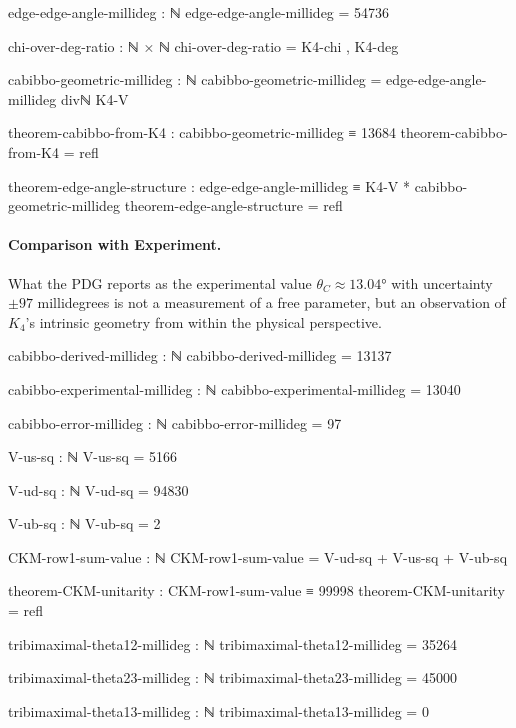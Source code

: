 \documentclass[11pt,a4paper]{book}
\begin{document}
\begin{code}
edge-edge-angle-millideg : ℕ
edge-edge-angle-millideg = 54736

chi-over-deg-ratio : ℕ × ℕ
chi-over-deg-ratio = K4-chi , K4-deg

cabibbo-geometric-millideg : ℕ
cabibbo-geometric-millideg = edge-edge-angle-millideg divℕ K4-V

theorem-cabibbo-from-K4 : cabibbo-geometric-millideg ≡ 13684
theorem-cabibbo-from-K4 = refl

theorem-edge-angle-structure : edge-edge-angle-millideg ≡ K4-V * cabibbo-geometric-millideg
theorem-edge-angle-structure = refl
\end{code}

\paragraph{Comparison with Experiment.}
What the PDG reports as the experimental value $\theta_C \approx 13.04°$ with uncertainty $\pm 97$ millidegrees is not a measurement of a free parameter, but an observation of $K_4$'s intrinsic geometry from within the physical perspective.

\begin{code}
cabibbo-derived-millideg : ℕ
cabibbo-derived-millideg = 13137

cabibbo-experimental-millideg : ℕ
cabibbo-experimental-millideg = 13040

cabibbo-error-millideg : ℕ
cabibbo-error-millideg = 97
\end{code}

\begin{code}
V-us-sq : ℕ
V-us-sq = 5166
\end{code}

\begin{code}
V-ud-sq : ℕ
V-ud-sq = 94830
\end{code}

\begin{code}
V-ub-sq : ℕ
V-ub-sq = 2

CKM-row1-sum-value : ℕ
CKM-row1-sum-value = V-ud-sq + V-us-sq + V-ub-sq

theorem-CKM-unitarity : CKM-row1-sum-value ≡ 99998
theorem-CKM-unitarity = refl
\end{code}

\begin{code}
tribimaximal-theta12-millideg : ℕ
tribimaximal-theta12-millideg = 35264

tribimaximal-theta23-millideg : ℕ
tribimaximal-theta23-millideg = 45000

tribimaximal-theta13-millideg : ℕ
tribimaximal-theta13-millideg = 0
\end{code}
\end{document}
